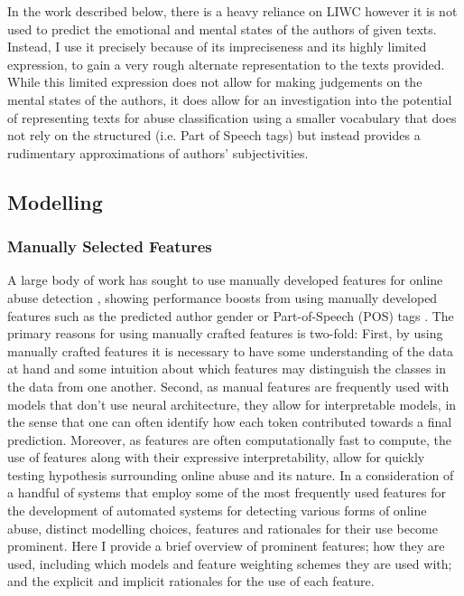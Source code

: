 {In the work described below, there is a heavy reliance on LIWC however it is not used to predict the emotional and mental states of the authors of given texts.
Instead, I use it precisely because of its impreciseness and its highly limited expression, to gain a very rough alternate representation to the texts provided.
While this limited expression does not allow for making judgements on the mental states of the authors, it does allow for an investigation into the potential of representing texts for abuse classification using a smaller vocabulary that does not rely on the structured (i.e. Part of Speech tags) but instead provides a rudimentary approximations of authors' subjectivities.
}

\subsection{Modelling}
\subsubsection{Manually Selected Features}

A large body of work has sought to use manually developed features for online abuse detection \citep[e.g.]{Davidson:2017,Waseem:2017,Wiegand:2019,Fortuna:2018}, showing performance boosts from using manually developed features such as the predicted author gender \citep{Waseem-Hovy:2016} or Part-of-Speech (POS) tags \citep{Davidson:2017}. 
The primary reasons for using manually crafted features is two-fold: First, by using manually crafted features it is necessary to have some understanding of the data at hand and some intuition about which features may distinguish the classes in the data from one another. 
Second, as manual features are frequently used with models that don't use neural architecture, they allow for interpretable models, in the sense that one can often identify how each token contributed towards a final prediction. 
Moreover, as features are often computationally fast to compute, the use of features along with their expressive interpretability, allow for quickly testing hypothesis surrounding online abuse and its nature.
In a consideration of a handful of systems that employ some of the most frequently used features for the development of automated systems for detecting various forms of online abuse, distinct modelling choices, features and rationales for their use become prominent. 
Here I provide a brief overview of prominent features; how they are used, including which models and feature weighting schemes they are used with; and the explicit and implicit rationales for the use of each feature.

